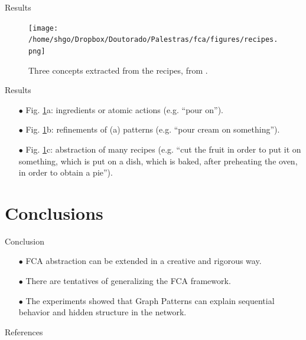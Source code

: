 \documentclass[pdf,xcolor=table]{beamer}
\begin{document}
\begin{frame}[t]{Results}
    \begin{figure}[h]
        \texttt{[image: /home/shgo/Dropbox/Doutorado/Palestras/fca/figures/recipes.png]}
        \caption{Three concepts extracted from the recipes, from \cite{Ferre2016}.}
        \label{fig:recipe_concepts}
    \end{figure}
\end{frame}

\begin{frame}[t]{Results}
    \begin{itemize}
        \item[$\bullet$] Fig. \ref{fig:recipe_concepts}a: ingredients or atomic actions (e.g. ``pour on'').
        \item[$\bullet$] Fig. \ref{fig:recipe_concepts}b: refinements of (a) patterns (e.g. ``pour cream on something'').
        \item[$\bullet$] Fig. \ref{fig:recipe_concepts}c: abstraction of many recipes (e.g. ``cut the fruit in order to put it on something, which is put on a dish, which is baked, after preheating the oven, in order to obtain a pie'').
    \end{itemize}
\end{frame}

\section{Conclusions}
\begin{frame}[t]{Conclusion}
    \begin{itemize}
        \item[$\bullet$] FCA abstraction can be extended in a creative and rigorous way.
        \item[$\bullet$] There are tentatives of generalizing the FCA framework.
        \item[$\bullet$] The experiments showed that Graph Patterns can explain sequential behavior and hidden structure in the network. 
    \end{itemize}
\end{frame}

\begin{frame}[t,allowframebreaks]{References}
    \printbibliography
\end{frame}
\end{document}
